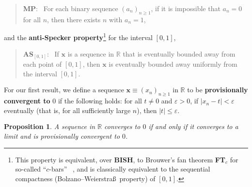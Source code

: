 \documentclass[11pt]{article}%
\newtheorem{proposition}[theorem]{Proposition}
\begin{document}
\begin{quote}
\textbf{MP}: \ For each binary sequence $\left(  a_{n}\right)  _{n\geqslant1}%
$, if it is impossible that $a_{n}=0$ for all $n$, then there exists $n$ with
$a_{n}=1$,
\end{quote}%

\noindent
and the \textbf{anti-Specker property}\footnote{%
\normalfont\sf
This property is equivalent, over \textbf{BISH}, to Brouwer's fan theorem
\textbf{FT}$_{c}$ for so-called \textquotedblleft$c$-bars\textquotedblright%
\ \cite{BBerg}, and is classically equivalent to the sequential compactness
(Bolzano--Weierstra\ss \ property) of $\left[  0,1\right]  $.} for the
interval $\left[  0,1\right]  $,

\begin{quote}
\textbf{AS}$_{\left[  0,1\right]  }$: \ If $\mathbf{x}$ is a sequence in
$\mathbb{R}$ that is eventually bounded away from each point of $\left[
0,1\right]  $, then $\mathbf{x}$ is eventually bounded away uniformly from the
interval $\left[  0,1\right]  $.
\end{quote}%

\bigskip


For our first result, we define a sequence $\mathbf{x}\equiv\left(
x_{n}\right)  _{n\geqslant1}$ in $\mathbb{R}$ to be \textbf{provisionally
convergent to }$0$ if the following holds: for all $t\neq0$ and $\varepsilon
>0$, if $\left\vert x_{n}-t\right\vert <\varepsilon$ eventually (that is, for
all sufficiently large $n$), then $\left\vert t\right\vert \leqslant
\varepsilon$.

\begin{proposition}
\label{1}A sequence in $\mathbb{R}$ converges to $0$ if and only if it
converges to a limit and is provisionally convergent to $0$.
\end{proposition}
\end{document}
